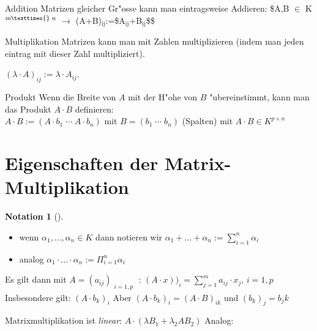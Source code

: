 \documentclass[fontsize=11pt,paper=a4,BCOR=0mm,DIV=11,automark,headsepline]{scrbook}
\theoremstyle{remark}
\theoremstyle{definition}
\newtheorem*{notation}{Notation}
\theoremstyle{proof}
\theoremstyle{remark}
\begin{document}
\begin{definition}{Addition}{}
Matrizen gleicher Gr"osse kann man eintragsweise Addieren: \$A,B \(\in\) K\(^{\text{m}\texttimes{}\text{
n}}\) \(\rightarrow\) (A+B)\(_{\text{ij}}\):=\$A\(_{\text{ij}}\)+B\(_{\text{ij}}\)\$\$
\end{definition}

\begin{definition}{Multiplikation}{}
Matrizen kann man mit Zahlen multiplizieren (indem man jeden eintrag mit dieser
Zahl multipliziert).

\((\lambda \cdot A)_{ij}:=\lambda \cdot A_{ij}\).
\end{definition}

\begin{definition}{Produkt}{}
Wenn die Breite von \(A\) mit der H"ohe von \(B\) "ubereinstimmt, kann man das
Produkt \(A\cdot B\) definieren: \\
\(A\cdot B:=(A\cdot b_1\; \cdots \; A\cdot b_n)\) mit \(B=(b_1\; \cdots\; b_n)\) (Spalten)
mit \(A\cdot B \in K^{p\times n}\)
\end{definition}

\section{Eigenschaften der Matrix-Multiplikation}
\label{sec:org8eaaee0}
\begin{notation}[] \label{}
\begin{itemize}
\item wenn \(\alpha_1,...,\alpha_n\in K\) dann notieren wir \(\alpha_1+...+\alpha_n :=
   \sum_{i=1}^{n}{\alpha_i}\)
\item analog \(\alpha_1\cdot ...\cdot\alpha_n := \Pi_{i=1}^{n}{\alpha_i}\)
\end{itemize}
\end{notation}

\begin{relation}
Es gilt dann mit \(A=(a_{ij})_{\substack{i=1,p}}\) : \((A\cdot
x))_i=\sum_{j=1}^{m}{a_{ij}\cdot x_j,\, i=1,p}\) \\

Insbesondere gilt: \((A\cdot b_k)_i\) Aber \((A\cdot b_k)_i = (A\cdot B)_{ik}\) und \((b_k)_j=b_jk\)
\end{relation}

\begin{relation}
Matrixmultiplikation ist \emph{linear}: \(A\cdot (\lambda B_1 + \lambda_2 A B_2)\)
Analog:
\end{relation}
\end{document}
